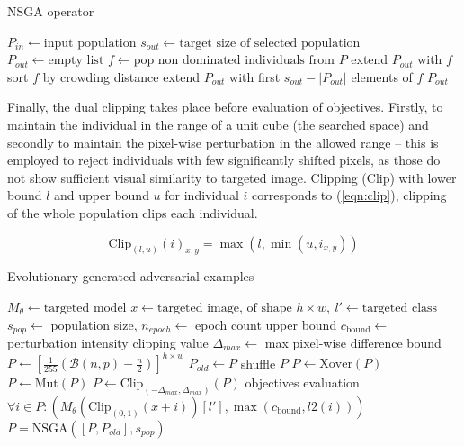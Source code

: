 \begin{algorithm}
\caption{NSGA operator}
\label{algo:nsga_cd}
\begin{algorithmic}
\STATE $P_{in} \gets \text{input population}$
\STATE $s_{out} \gets \text{target size of selected population}$
\STATE
\STATE $P_{out} \gets \text{empty list}$
\STATE $f \gets \text{pop non dominated individuals from } P$
\STATE extend $P_{out}$ with $f$
\ELSE
\STATE sort $f$ by crowding distance
\STATE extend $P_{out}$ with first $s_{out} - |P_{out}|$ elements of $f$
\ENDIF
\ENDWHILE
\RETURN $P_{out}$
\end{algorithmic}
\end{algorithm}

Finally, the dual clipping takes place before evaluation of objectives. Firstly, to maintain the individual in the range of a unit cube (the searched space) and secondly to maintain the pixel-wise perturbation in the allowed range -- this is employed to reject individuals with few significantly shifted pixels, as those do not show sufficient visual similarity to targeted image. Clipping (Clip) with lower bound $l$ and upper bound $u$ for individual $i$ corresponds to (\ref{eqn:clip}), clipping of the whole population clips each individual.

\begin{equation} \label{eqn:clip}
\text{Clip}_{(l,u)}(i)_{x, y} = \max\left(l, \min(u, i_{x, y})\right)
\end{equation}

\begin{algorithm}
\caption{Evolutionary generated adversarial examples}
\label{algo:evgena}
\begin{algorithmic}
\STATE $M_\theta \gets \text{targeted model}$
\STATE $x \gets \text{targeted image, of shape } h \times w,\ l' \gets \text{targeted class}$
\STATE $s_{pop} \gets$ population size, $n_{epoch} \gets$ epoch count upper bound
\STATE $c_\text{bound} \gets$ perturbation intensity clipping value
\STATE $\Delta_{max} \gets$ max pixel-wise difference bound
\STATE
\STATE $P \gets \left[\frac{1}{255}\left(\mathcal{B}(n, p) - \frac{n}{2}\right)\right]^{h \times w}$
\STATE $P_{old} \gets P$
\STATE shuffle $P$
\STATE $P \gets \text{Xover}(P)$
\STATE $P \gets \text{Mut}(P)$
\STATE $P \gets \text{Clip}_{(-\Delta_{max},\Delta_{max})}(P)$
\STATE objectives evaluation $\forall i \in P: \left(
    M_\theta \left(\text{Clip}_{(0,1)}\left(x + i\right) \right)[l'],
    \max \left(c_\text{bound}, l2\left(i\right) \right)
\right)$
\STATE $P = \text{NSGA}\left([P, P_{old}], s_{pop}\right)$
\ENDWHILE
\end{algorithmic}
\end{algorithm}

